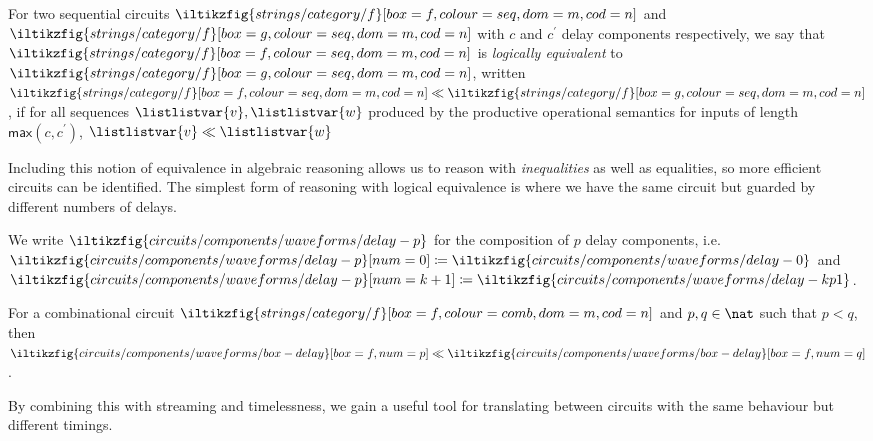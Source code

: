 \documentclass{lmcs}
\begin{document}
\begin{defi}
    For two sequential circuits \(
    \iltikzfig{strings/category/f}[box=f,colour=seq,dom=m,cod=n]
    \) and \(
    \iltikzfig{strings/category/f}[box=g,colour=seq,dom=m,cod=n]
    \) with \(c\) and \(c^\prime\) delay components respectively, we say that \(
    \iltikzfig{strings/category/f}[box=f,colour=seq,dom=m,cod=n]
    \) is \emph{logically equivalent} to \(
    \iltikzfig{strings/category/f}[box=g,colour=seq,dom=m,cod=n]
    \), written \(
    \iltikzfig{strings/category/f}[box=f,colour=seq,dom=m,cod=n]
    \ll
    \iltikzfig{strings/category/f}[box=g,colour=seq,dom=m,cod=n]
    \), if for all sequences \(\listlistvar{v},\listlistvar{w}\) produced by the
    productive operational semantics for inputs of length
    \(\mathsf{max}(c,c^\prime)\),  \(\listlistvar{v} \ll \listlistvar{w}\)
\end{defi}

Including this notion of equivalence in algebraic reasoning allows us to reason
with \emph{inequalities} as well as equalities, so more efficient circuits can
be identified.
The simplest form of reasoning with logical equivalence is where we have the
same circuit but guarded by different numbers of delays.

\begin{nota}
    We write \(
    \iltikzfig{circuits/components/waveforms/delay-p}
    \) for the composition of \(p\) delay components, i.e.\ \(
    \iltikzfig{circuits/components/waveforms/delay-p}[num=0]
    \coloneqq
    \iltikzfig{circuits/components/waveforms/delay-0}
    \) and \(
    \iltikzfig{circuits/components/waveforms/delay-p}[num=k+1]
    \coloneqq
    \iltikzfig{circuits/components/waveforms/delay-kp1}
    \).
\end{nota}

\begin{lem}
    For a combinational circuit \(
    \iltikzfig{strings/category/f}[box=f,colour=comb,dom=m,cod=n]
    \) and \(p,q \in \nat\) such that \(p < q\), then \(
    \iltikzfig{circuits/components/waveforms/box-delay}[box=f,num=p]
    \ll
    \iltikzfig{circuits/components/waveforms/box-delay}[box=f,num=q]
    \).
\end{lem}

By combining this with streaming and timelessness, we gain a useful tool for
translating between circuits with the same behaviour but different timings.
\end{document}
